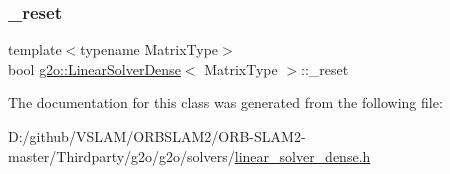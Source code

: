 \mbox{\label{classg2o_1_1_linear_solver_dense_a2d82ac52c9c24501cccee3ef3cb575fe}} 
\subsubsection{\texorpdfstring{\+\_\+reset}{\_reset}}
{\footnotesize\ttfamily template$<$typename Matrix\+Type$>$ \\
bool \mbox{\hyperlink{classg2o_1_1_linear_solver_dense}{g2o\+::\+Linear\+Solver\+Dense}}$<$ Matrix\+Type $>$\+::\+\_\+reset\hspace{0.3cm}{\ttfamily [protected]}}



The documentation for this class was generated from the following file\+:\begin{DoxyCompactItemize}
\item 
D\+:/github/\+V\+S\+L\+A\+M/\+O\+R\+B\+S\+L\+A\+M2/\+O\+R\+B-\/\+S\+L\+A\+M2-\/master/\+Thirdparty/g2o/g2o/solvers/\mbox{\hyperlink{linear__solver__dense_8h}{linear\+\_\+solver\+\_\+dense.\+h}}\end{DoxyCompactItemize}
